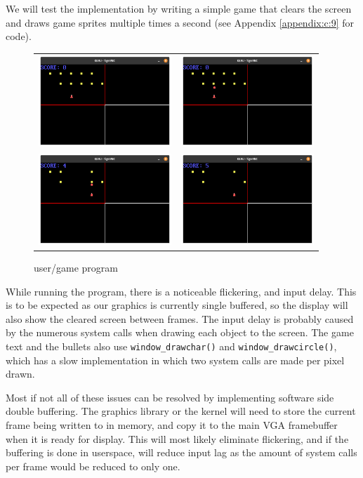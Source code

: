We will test the implementation by writing a simple game that clears the screen
and draws game sprites multiple times a second (see Appendix \ref{appendix:c:9} for code).

\begin{figure}[H]
    \centering
    \begin{tabular}{cc}
    \includegraphics[width=5cm]{game0.png} & \includegraphics[width=5cm]{game1.png} \\
    \includegraphics[width=5cm]{game2.png} & \includegraphics[width=5cm]{game3.png} \\
    \end{tabular}
    \caption{user/game program}
    \label{figure:game}
\end{figure}

While running the program, there is a noticeable flickering, and input delay.
This is to be expected as our graphics is currently single buffered, so the display
will also show the cleared screen between frames. The input delay is probably caused
by the numerous system calls when drawing each object to the screen. The game text
and the bullets also use \texttt{window_drawchar()}
and \texttt{window_drawcircle()}, which has a slow implementation in which two system calls are
made per pixel drawn.

Most if not all of these issues can be resolved by implementing software side
double buffering. The graphics library or the kernel will need to store the
current frame being written to in memory, and copy it to the main VGA
framebuffer when it is ready for display. This will most likely eliminate
flickering, and if the buffering is done in userspace, will reduce input lag as
the amount of system calls per frame would be reduced to only one.